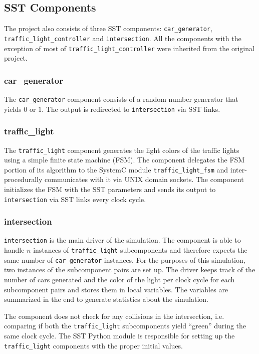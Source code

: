 \documentclass{article}
\begin{document}
    \subsection{SST Components}
    The project also consists of three SST components: \lstinline{car_generator},
    \lstinline{traffic_light_controller} and \lstinline{intersection}. All the components with the
    exception of most of \lstinline{traffic_light_controller} were inherited from the original
    project.

      \subsubsection{car\_generator}
      The \lstinline{car_generator} component consists of a random number generator that yields $0$
      or $1$. The output is redirected to \lstinline{intersection} via SST links.

      \subsubsection{traffic\_light}

      The \lstinline{traffic_light} component generates the light colors of the traffic lights using
      a simple finite state machine (FSM). The component delegates the FSM portion of its algorithm
      to the SystemC module \lstinline{traffic_light_fsm} and inter-procedurally communicates with
      it via UNIX domain sockets. The component initializes the FSM with the SST parameters and
      sends its output to \lstinline{intersection} via SST links every clock cycle.

      \subsubsection{intersection}
      \lstinline{intersection} is the main driver of the simulation. The component is able to handle
      $n$ instances of \lstinline{traffic_light} subcomponents and therefore expects the same number
      of \lstinline{car_generator} instances. For the purposes of this simulation, two instances of
      the subcomponent pairs are set up. The driver keeps track of the number of cars generated and
      the color of the light per clock cycle for each subcomponent pairs and stores them in local
      variables. The variables are summarized in the end to generate statistics about the
      simulation.

      The component does not check for any collisions in the intersection, i.e. comparing if both
      the \lstinline{traffic_light} subcomponents yield ``green'' during the same clock cycle. The
      SST Python module is responsible for setting up the \lstinline{traffic_light} components with
      the proper initial values.
\end{document}
